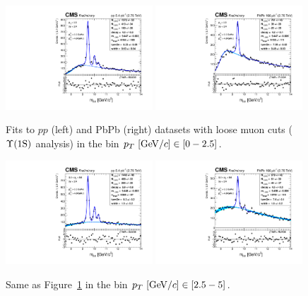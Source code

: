 \begin{figure}
  \includegraphics[width=0.49\textwidth]{Chapters/aYield/pp/pt_3p5_4/Pt/Pt_0_2p5/pp2p76tev_Pt_0_2p5_fsr1.pdf}  
  \includegraphics[width=0.49\textwidth]{Chapters/aYield/PbPb/pt_3p5_4/Pt/Pt_0_2p5/PbPb_Pt_0_2p5_fsr1.pdf}
  \caption{Fits to $pp$ (left) and PbPb (right) datasets with loose muon cuts ($\Upsilon\mathrm{(1S)}$ analysis) in the bin $p_{T}~[{\rm GeV}/c]\in [0 - 2.5]$.}
  \label{fig:YieldsErfExp_pt1Sa} 
\end{figure}
\begin{figure}
  \includegraphics[width=0.49\textwidth]{Chapters/aYield/pp/pt_3p5_4/Pt/Pt_2p5_5/pp2p76tev_Pt_2p5_5_fsr1.pdf}  
  \includegraphics[width=0.49\textwidth]{Chapters/aYield/PbPb/pt_3p5_4/Pt/Pt_2p5_5/PbPb_Pt_2p5_5_fsr1.pdf}
  \caption{Same as Figure~\ref{fig:YieldsErfExp_pt1Sa} in the bin $p_{T}~[{\rm GeV}/c]\in [2.5 - 5]$.}
  \label{fig:YieldsErfExp_pt1Sb} 
\end{figure}

